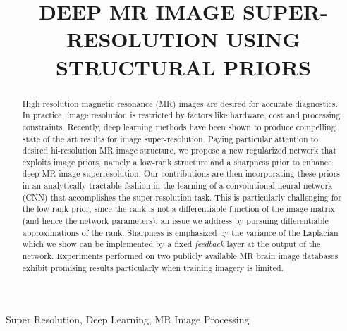 \documentclass{article}
\title{DEEP MR IMAGE SUPER-RESOLUTION USING STRUCTURAL PRIORS }
\def\sqz{\vspace{-3pt}}
\begin{document}
\maketitle

\begin{abstract}
High resolution magnetic resonance (MR) images are desired for accurate diagnostics. In practice, image resolution is restricted by factors like hardware, cost and processing constraints. Recently, deep learning methods have been shown to produce compelling state of the art results for image super-resolution. Paying particular attention to desired hi-resolution MR image structure, we propose a new regularized network that exploits image priors, namely a low-rank structure and a sharpness prior to enhance deep MR image superresolution.  Our contributions are then incorporating these priors in an analytically tractable fashion in the learning of a convolutional neural network (CNN) that accomplishes the super-resolution task. This is particularly challenging for the low rank prior, since the rank is not a differentiable function of the image matrix (and hence the network parameters), an issue we address by pursuing differentiable approximations of the rank. Sharpness is emphasized by the variance of the Laplacian which we show can be implemented by a fixed {\em feedback} layer at the output of the network. Experiments performed on two publicly available MR brain image databases exhibit promising results particularly when training imagery is limited.

\end{abstract}
\sqz
\begin{keywords}
Super Resolution, Deep Learning, MR Image Processing
\end{keywords}
\end{document}
